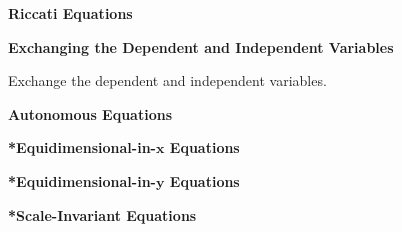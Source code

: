 {%
\begin{Hint}
  \label{hint t2dydt+2ty-y3=0}
\end{Hint}



\begin{large}
  \noindent
  \textbf{Riccati Equations}
\end{large}





\begin{Hint}
  \label{hint riccati 2 methods}
\end{Hint}







\begin{large}
  \noindent
  \textbf{Exchanging the Dependent and Independent Variables}
\end{large}



\begin{Hint}
  \label{hint y'=sqrt y xyy}
  Exchange the dependent and independent variables.
\end{Hint}



\begin{large}
  \noindent
  \textbf{Autonomous Equations}
\end{large}



\begin{large}
  \noindent
  \textbf{*Equidimensional-in-$\mathbf{x}$ Equations}
\end{large}



\begin{large}
  \noindent
  \textbf{*Equidimensional-in-$\mathbf{y}$ Equations}
\end{large}



\begin{large}
  \noindent
  \textbf{*Scale-Invariant Equations}
\end{large}








\raggedbottom
}

